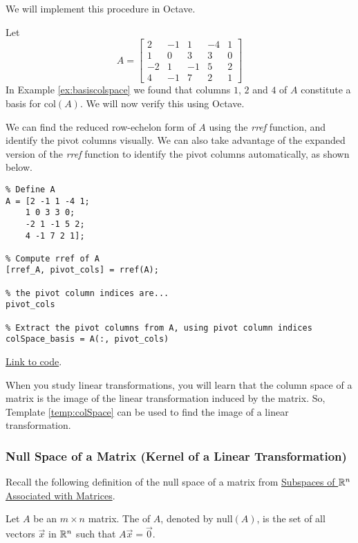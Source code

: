 \documentclass{ximera}
\begin{document}
We will implement this procedure in Octave.

\begin{template}\label{temp:colSpace}
Let $$A=\begin{bmatrix}2&-1&1&-4&1\\1&0&3&3&0\\-2&1&-1&5&2\\4&-1&7&2&1\end{bmatrix}$$
In Example \ref{ex:basiscolspace} we found that columns $1$, $2$ and $4$ of $A$ constitute a basis for $\text{col}(A)$.  We will now verify this using Octave.

We can find the reduced row-echelon form of $A$ using the \emph{rref} function, and identify the pivot columns visually.  We can also take advantage of the expanded version of the \emph{rref} function to identify the pivot columns automatically, as shown below.

\begin{verbatim}
% Define A
A = [2 -1 1 -4 1;
    1 0 3 3 0;
    -2 1 -1 5 2;
    4 -1 7 2 1];

% Compute rref of A
[rref_A, pivot_cols] = rref(A);

% the pivot column indices are...
pivot_cols

% Extract the pivot columns from A, using pivot column indices
colSpace_basis = A(:, pivot_cols)
\end{verbatim}

\href{https://sagecell.sagemath.org/?z=eJxtTkEKwjAQvAfyh7kULNhiqiIoHoL6Ao9SSq2JBmxTklR8vhssKOjuZWeGmdkEe6VNpyA5k9jiVCATEMgWEBvOQCMww5x2NuKsiLrAEsXILCJcgfiSGM4S7GzbD0HBOaVhdUw_xbuSU_TmYUPV2LsvqTCyE5mOvnBTbx2kD20H011Mozxqp_I85-xjfhsOz-DqJvwYPbSzLahu8Ka7_g3ljPCxrxtVnWtvPH0jJ-vvB9MX3FlRVA==&lang=octave&interacts=eJyLjgUAARUAuQ==}{Link to code}.

\end{template}  

When you study linear transformations, you will learn that the column space of a matrix is the image of the linear transformation induced by the matrix.  So, Template \ref{temp:colSpace} can be used to find the image of a linear transformation.

\subsubsection*{Null Space of a Matrix (Kernel of a Linear Transformation)}

Recall the following definition of the null space of a matrix from \href{https://ximera.osu.edu/linearalgebradzv3/LinearAlgebraInteractiveIntro/VSP-0040/main}{Subspaces of $\mathbb{R}^n$ Associated with Matrices}.
\begin{definition}[\ref{def:nullspace}] Let $A$ be an $m\times n$ matrix.  The  of $A$, denoted by $\mbox{null}(A)$, is the set of all vectors $\vec{x}$ in $\mathbb{R}^n$ such that $A\vec{x}=\vec{0}$.
\end{definition}
\end{document}
